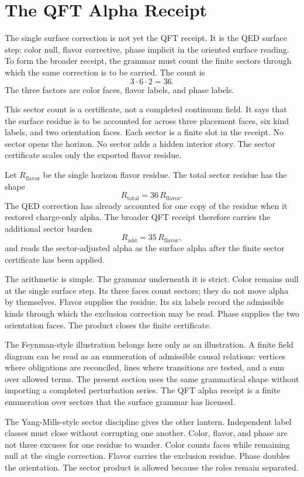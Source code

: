 \section{The QFT Alpha Receipt}

The single surface correction is not yet the QFT receipt. It is the QED
surface step: color null, flavor corrective, phase implicit in the oriented
surface reading. To form the broader receipt, the grammar must count the
finite sectors through which the same correction is to be carried. The count
is
\[
  3 \cdot 6 \cdot 2 = 36.
\]
The three factors are color faces, flavor labels, and phase labels.

This sector count is a certificate, not a completed continuum field. It says
that the surface residue is to be accounted for across three placement
faces, six kind labels, and two orientation faces. Each sector is a finite
slot in the receipt. No sector opens the horizon. No sector adds a hidden
interior story. The sector certificate scales only the exported flavor
residue.

Let \(R_{\mathrm{flavor}}\) be the single horizon flavor residue. The total
sector residue has the shape
\[
  R_{\mathrm{total}} = 36\,R_{\mathrm{flavor}}.
\]
The QED correction has already accounted for one copy of the residue when
it restored charge-only alpha. The broader QFT receipt therefore carries the
additional sector burden
\[
  R_{\mathrm{add}} = 35\,R_{\mathrm{flavor}},
\]
and reads the sector-adjusted alpha as the surface alpha after the finite
sector certificate has been applied.

The arithmetic is simple. The grammar underneath it is strict. Color remains
null at the single surface step. Its three faces count sectors; they do not
move alpha by themselves. Flavor supplies the residue. Its six labels
record the admissible kinds through which the exclusion correction may be
read. Phase supplies the two orientation faces. The product closes the
finite certificate.

The Feynman-style illustration belongs here only as an illustration. A
finite field diagram can be read as an enumeration of admissible causal
relations: vertices where obligations are reconciled, lines where
transitions are tested, and a sum over allowed terms. The present section
uses the same grammatical shape without importing a completed perturbation
series. The QFT alpha receipt is a finite enumeration over sectors that the
surface grammar has licensed.

The Yang-Mills-style sector discipline gives the other lantern. Independent
label classes must close without corrupting one another. Color, flavor, and
phase are not three excuses for one residue to wander. Color counts faces
while remaining null at the single correction. Flavor carries the
exclusion residue. Phase doubles the orientation. The sector product is
allowed because the roles remain separated.

